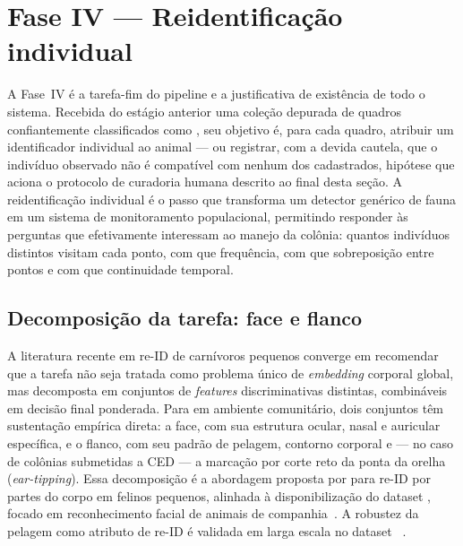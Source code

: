 \section{Fase IV --- Reidentificação individual}
\label{sec:pipeline-fase4}

A Fase~IV é a tarefa-fim do pipeline e a justificativa de existência de todo o sistema. Recebida do estágio anterior uma coleção depurada de quadros confiantemente classificados como , seu objetivo é, para cada quadro, atribuir um identificador individual ao animal --- ou registrar, com a devida cautela, que o indivíduo observado não é compatível com nenhum dos cadastrados, hipótese que aciona o protocolo de curadoria humana descrito ao final desta seção. A reidentificação individual é o passo que transforma um detector genérico de fauna em um sistema de monitoramento populacional, permitindo responder às perguntas que efetivamente interessam ao manejo da colônia: quantos indivíduos distintos visitam cada ponto, com que frequência, com que sobreposição entre pontos e com que continuidade temporal.

\subsection*{Decomposição da tarefa: face e flanco}

A literatura recente em re-ID de carnívoros pequenos converge em recomendar que a tarefa não seja tratada como problema único de \emph{embedding} corporal global, mas decomposta em conjuntos de \emph{features} discriminativas distintas, combináveis em decisão final ponderada. Para  em ambiente comunitário, dois conjuntos têm sustentação empírica direta: a face, com sua estrutura ocular, nasal e auricular específica, e o flanco, com seu padrão de pelagem, contorno corporal e --- no caso de colônias submetidas a CED --- a marcação por corte reto da ponta da orelha (\emph{ear-tipping}). Essa decomposição é a abordagem proposta por  para re-ID por partes do corpo em felinos pequenos, alinhada à disponibilização do dataset \modeloPetFace, focado em reconhecimento facial de animais de companhia~\cite{shinoda2024petface}. A robustez da pelagem como atributo de re-ID é validada em larga escala no dataset \modeloWildlife~\cite{adam2024wildlifereid10k}.


